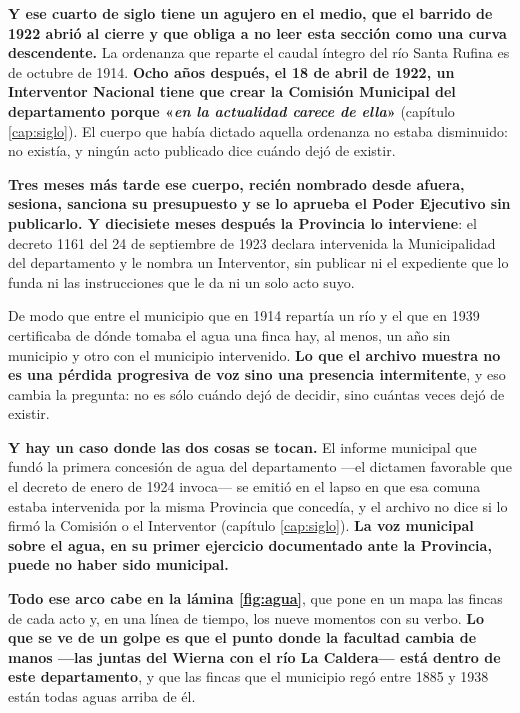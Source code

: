 \begin{cautela}
\textbf{Y ese cuarto de siglo tiene un agujero en el medio, que el barrido de 1922 abrió al
cierre y que obliga a no leer esta sección como una curva descendente.} La ordenanza que reparte
el caudal íntegro del río Santa Rufina es de octubre de 1914. \textbf{Ocho años después, el 18 de
abril de 1922, un Interventor Nacional tiene que crear la Comisión Municipal del departamento
porque «\textit{en la actualidad carece de ella}»} (capítulo \ref{cap:siglo}). El cuerpo que
había dictado aquella ordenanza no estaba disminuido: no existía, y ningún acto publicado dice
cuándo dejó de existir.

\textbf{Tres meses más tarde ese cuerpo, recién nombrado desde afuera, sesiona, sanciona su
presupuesto y se lo aprueba el Poder Ejecutivo sin publicarlo. Y diecisiete meses después la
Provincia lo interviene}: el decreto 1161 del 24 de septiembre de 1923 declara intervenida la
Municipalidad del departamento y le nombra un Interventor, sin publicar ni el expediente que lo
funda ni las instrucciones que le da ni un solo acto suyo.

De modo que entre el municipio
que en 1914 repartía un río y el que en 1939 certificaba de dónde tomaba el agua una finca hay,
al menos, un año sin municipio y otro con el municipio intervenido. \textbf{Lo que el archivo muestra no es una
pérdida progresiva de voz sino una presencia intermitente}, y eso cambia la pregunta: no es sólo
cuándo dejó de decidir, sino cuántas veces dejó de existir.

\textbf{Y hay un caso donde las dos cosas se tocan.} El informe municipal que fundó la primera
concesión de agua del departamento ---el dictamen favorable que el decreto de enero de 1924
invoca--- se emitió en el lapso en que esa comuna estaba intervenida por la misma Provincia que
concedía, y el archivo no dice si lo firmó la Comisión o el Interventor (capítulo
\ref{cap:siglo}). \textbf{La voz municipal sobre el agua, en su primer ejercicio documentado ante
la Provincia, puede no haber sido municipal.}


\textbf{Todo ese arco cabe en la lámina \ref{fig:agua}}, que pone en un mapa las fincas de cada
acto y, en una línea de tiempo, los nueve momentos con su verbo. \textbf{Lo que se ve de un golpe
es que el punto donde la facultad cambia de manos ---las juntas del Wierna con el río La
Caldera--- está dentro de este departamento}, y que las fincas que el municipio regó entre 1885
y 1938 están todas aguas arriba de él.


\end{cautela}
